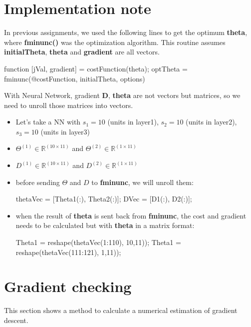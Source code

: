 \documentclass[a4paper,12pt]{report}
\begin{document}
\section{Implementation note}
In previous assignments, we used the following lines to get the optimum \textbf{theta}, where \textbf{fminunc()} was the optimization algorithm. This routine assumes \textbf{initialTheta}, \textbf{theta} and \textbf{gradient} are all vectors.
\begin{python}
function [jVal, gradient] = costFunction(theta);
optTheta = fminunc(@costFunction, initialTheta, options)
\end{python}
With Neural Network, gradient \textbf{D}, \textbf{theta} are not vectors but matrices, so we need to unroll those matrices into vectors. \\
\begin{itemize}
\item Let's take a NN with $s_1=10$ (units in layer1), $s_2=10$ (units in layer2), $s_3=10$ (units in layer3)
\item $\Theta ^{(1)} \in \mathbb{R}^{(10\times 11)}$ and $\Theta ^{(2)} \in \mathbb{R}^{(1\times 11)}$
\item $D^{(1)} \in \mathbb{R}^{(10\times 11)}$ and $D^{(2)} \in \mathbb{R}^{(1\times 11)}$
\item before sending $\Theta$ and $D$ to \textbf{fminunc}, we will unroll them: \\
\begin{python}
thetaVec = [Theta1(:), Theta2(:)];
DVec = [D1(:), D2(:)];
\end{python}
\item when the result of \textbf{theta} is sent back from \textbf{fminunc}, the cost and gradient needs to be calculated but with \textbf{theta} in a matrix format:\\
\begin{python}
Theta1 = reshape(thetaVec(1:110), 10,11));
Theta1 = reshape(thetaVec(111:121), 1,11));
\end{python}
\end{itemize}

\section{Gradient checking}
This section shows a method to calculate a numerical estimation of gradient descent.
\end{document}

